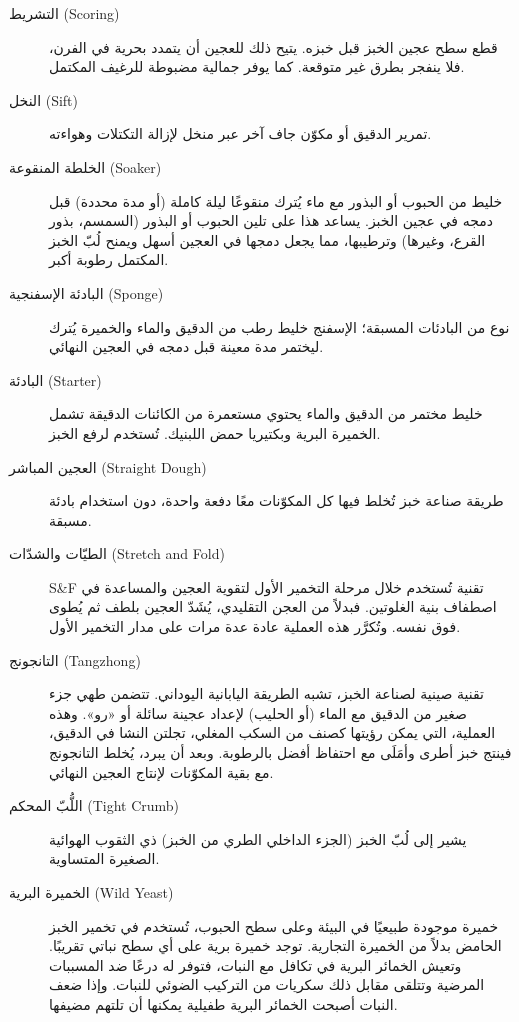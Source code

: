 \begin{description}
\item[التشريط \textenglish{(Scoring)}]
قطع سطح عجين الخبز قبل خبزه. يتيح ذلك للعجين أن يتمدد بحرية في الفرن، فلا ينفجر بطرق غير متوقعة. كما يوفر جمالية مضبوطة للرغيف المكتمل.

\item[النخل \textenglish{(Sift)}]
تمرير الدقيق أو مكوّن جاف آخر عبر منخل لإزالة التكتلات وهواءته.

\item[الخلطة المنقوعة \textenglish{(Soaker)}]
خليط من الحبوب أو البذور مع ماء يُترك منقوعًا ليلة كاملة (أو مدة محددة) قبل دمجه في عجين الخبز. يساعد هذا على تلين الحبوب أو البذور (السمسم، بذور القرع، وغيرها) وترطيبها، مما يجعل دمجها في العجين أسهل ويمنح لُبّ الخبز المكتمل رطوبة أكبر.

\item[البادئة الإسفنجية \textenglish{(Sponge)}]
نوع من البادئات المسبقة؛ الإسفنج خليط رطب من الدقيق والماء والخميرة يُترك ليختمر مدة معينة قبل دمجه في العجين النهائي.

\item[البادئة \textenglish{(Starter)}]
خليط مختمر من الدقيق والماء يحتوي مستعمرة من الكائنات الدقيقة تشمل الخميرة البرية وبكتيريا حمض اللبنيك. تُستخدم لرفع الخبز.

\item[العجين المباشر \textenglish{(Straight Dough)}]
طريقة صناعة خبز تُخلط فيها كل المكوّنات معًا دفعة واحدة، دون استخدام بادئة مسبقة.

\item[الطيّات والشدّات \textenglish{(Stretch and Fold)}]
\textenglish{S\&F} تقنية تُستخدم خلال مرحلة التخمير الأول لتقوية العجين والمساعدة في اصطفاف بنية الغلوتين. فبدلاً من العجن التقليدي، يُشَدّ العجين بلطف ثم يُطوى فوق نفسه. وتُكرَّر هذه العملية عادة عدة مرات على مدار التخمير الأول.

\item[التانجونج \textenglish{(Tangzhong)}]
تقنية صينية لصناعة الخبز، تشبه الطريقة اليابانية اليوداني. تتضمن طهي جزء صغير من الدقيق مع الماء (أو الحليب) لإعداد عجينة سائلة أو «رو». وهذه العملية، التي يمكن رؤيتها كصنف من السكب المغلي، تجلتن النشا في الدقيق، فينتج خبز أطرى وأمَلَى مع احتفاظ أفضل بالرطوبة. وبعد أن يبرد، يُخلط التانجونج مع بقية المكوّنات لإنتاج العجين النهائي.

\item[اللُّبّ المحكم \textenglish{(Tight Crumb)}]
يشير إلى لُبّ الخبز (الجزء الداخلي الطري من الخبز) ذي الثقوب الهوائية الصغيرة المتساوية.

\item[الخميرة البرية \textenglish{(Wild Yeast)}]
خميرة موجودة طبيعيًا في البيئة وعلى سطح الحبوب، تُستخدم في تخمير الخبز الحامض بدلاً من الخميرة التجارية. توجد خميرة برية على أي سطح نباتي تقريبًا. وتعيش الخمائر البرية في تكافل مع النبات، فتوفر له درعًا ضد المسببات المرضية وتتلقى مقابل ذلك سكريات من التركيب الضوئي للنبات. وإذا ضعف النبات أصبحت الخمائر البرية طفيلية يمكنها أن تلتهم مضيفها.


\end{description}
